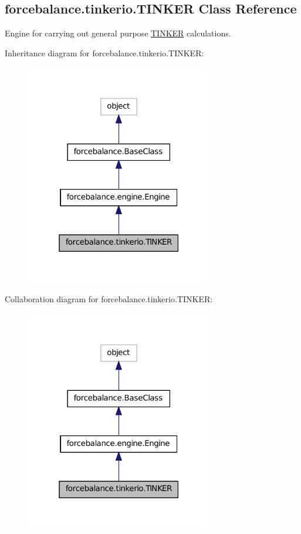 \hypertarget{classforcebalance_1_1tinkerio_1_1TINKER}{\subsection{forcebalance.\-tinkerio.\-T\-I\-N\-K\-E\-R Class Reference}
\label{classforcebalance_1_1tinkerio_1_1TINKER}
}


Engine for carrying out general purpose \hyperlink{classforcebalance_1_1tinkerio_1_1TINKER}{T\-I\-N\-K\-E\-R} calculations.  




Inheritance diagram for forcebalance.\-tinkerio.\-T\-I\-N\-K\-E\-R\-:
\nopagebreak
\begin{figure}[H]
\begin{center}
\leavevmode
\includegraphics[width=232pt]{classforcebalance_1_1tinkerio_1_1TINKER__inherit__graph}
\end{center}
\end{figure}


Collaboration diagram for forcebalance.\-tinkerio.\-T\-I\-N\-K\-E\-R\-:
\nopagebreak
\begin{figure}[H]
\begin{center}
\leavevmode
\includegraphics[width=232pt]{classforcebalance_1_1tinkerio_1_1TINKER__coll__graph}
\end{center}
\end{figure}
